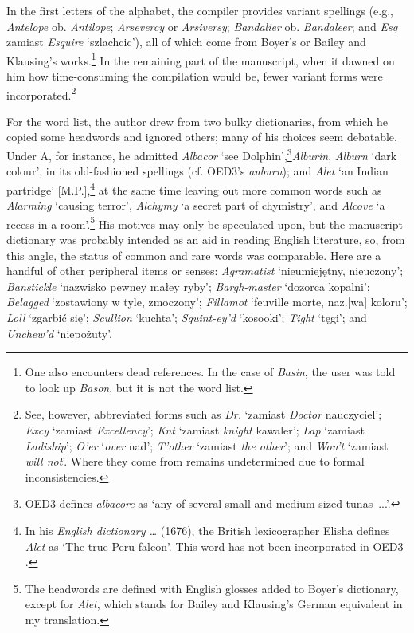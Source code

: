 \documentclass[output=paper,colorlinks,citecolor=brown,arabicfont,chinesefont]{langscibook}
\begin{document}
In the first letters of the alphabet, the compiler provides variant spellings (e.g., \emph{Antelope} ob. \emph{Antilope}; \emph{Arsevercy} or \emph{Arsiversy}; \emph{Bandalier} ob. \emph{Bandaleer}; and \emph{Esq} zamiast \emph{Esquire} ‘szlachcic’), all of which come from Boyer’s or Bailey and Klausing’s works.\footnote{One also encounters dead references. In the case of \emph{Basin}, the user was told to look up \emph{Bason}, but it is not the word list.} In the remaining part of the manuscript, when it dawned on him how time-consuming the compilation would be, fewer variant forms were incorporated.\footnote{See, however, abbreviated forms such as \emph{Dr.} ‘zamiast \emph{Doctor} nauczyciel’; \emph{Excy} ‘zamiast \emph{Excellency}’; \emph{Knt} ‘zamiast \emph{knight} kawaler’; \emph{Lap} ‘zamiast \emph{Ladiship}’; \emph{O’er} ‘\emph{over} nad’; \emph{T’other} ‘zamiast \emph{the other}’; and \emph{Won’t} ‘zamiast \emph{will not}’. Where they come from remains undetermined due to formal inconsistencies.} 

For the word list, the author drew from two bulky dictionaries, from which he copied some headwords and ignored others; many of his choices seem debatable. Under A, for instance, he admitted \emph{Albacor} ‘see Dolphin’,\footnote{OED3 \citep{OED3} defines \emph{albacore} as ‘any of several small and medium-sized tunas~...’. }\emph{Alburin}, \emph{Alburn} ‘dark colour’, in its old-fashioned spellings (cf. OED3's \emph{auburn}); and \emph{Alet} ‘an Indian partridge’ [M.P.],\footnote{In his \emph{English dictionary …} (1676), the British lexicographer Elisha \citet{Coles_elisha1677} defines \emph{Alet} as ‘The true Peru-falcon’. This word has not been incorporated in OED3 \citep{OED3}.} at the same time leaving out more common words such as \emph{Alarming} ‘causing terror’, \emph{Alchymy} ‘a secret part of chymistry’, and \emph{Alcove} ‘a recess in a room’.\footnote{The headwords are defined with English glosses added to Boyer’s dictionary, except for \emph{Alet}, which stands for Bailey and Klausing’s German equivalent in my translation.} His motives may only be speculated upon, but the manuscript dictionary was probably intended as an aid in reading English literature, so, from this angle, the status of common and rare words was comparable. Here are a handful of other peripheral items or senses: \emph{Agramatist} ‘nieumiejętny, nieuczony’; \emph{Banstickle} ‘nazwisko pewney małey ryby’; \emph{Bargh-master} ‘dozorca kopalni’; \emph{Belagged} ‘zostawiony w tyle, zmoczony’; \emph{Fillamot} ‘feuville morte, naz.[wa] koloru’; \emph{Loll} ‘zgarbić się’; \emph{Scullion} ‘kuchta’; \emph{Squint-ey’d} ‘kosooki’; \emph{Tight} ‘tęgi’; and \emph{Unchew’d} ‘niepożuty’.
\end{document}
